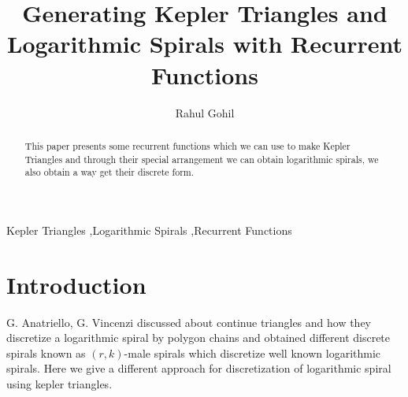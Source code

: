 \documentclass[preprint,12pt]{elsarticle}
\begin{document}
	
	\begin{frontmatter}
		
		\title{Generating Kepler Triangles and Logarithmic Spirals with Recurrent Functions}
		
		\author{Rahul Gohil}
		
		\address{Empty}
		\begin{abstract}
			This paper presents some recurrent functions which we can use to make Kepler Triangles and through their special arrangement we can obtain logarithmic spirals, we also obtain a way get their discrete form.  
		\end{abstract}
		
		\begin{keyword}
			Kepler Triangles \sep Logarithmic Spirals \sep Recurrent Functions
		\end{keyword}
		
	\end{frontmatter}
	
	\section{Introduction}
	G. Anatriello, G. Vincenzi\cite{paper1} discussed about continue triangles and how they discretize a logarithmic spiral by polygon chains and obtained different discrete spirals known as $(r, k)$-male spirals which discretize well known logarithmic spirals. Here we give a different approach for discretization of logarithmic spiral using kepler triangles.
\end{document}
